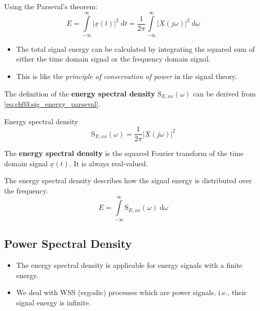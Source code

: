 \begin{refsection}
Using the Parseval's theorem:
\begin{equation}
	E = \int\limits_{-\infty}^{\infty} \left|\underline{x}(t)\right|^2 \; \mathrm{d} t = \frac{1}{2 \pi} \int\limits_{-\infty}^{\infty} \left|\underline{X}\left(j \omega\right)\right|^2 \; \mathrm{d} \omega
	\label{eq:ch03:sig_energy_parseval}
\end{equation}

\begin{itemize}
	\item The total signal energy can be calculated by integrating the squared sum of either the time domain signal or the frequency domain signal.
	\item This is like the \emph{principle of conservation of power} in the signal theory.
\end{itemize}

The definition of the \textbf{energy spectral density} $\mathrm{S}_{E,xx}(\omega)$ can be derived from \eqref{eq:ch03:sig_energy_parseval}.

\begin{definition}{Energy spectral density}
	\begin{equation}
		\mathrm{S}_{E,xx}(\omega) = \frac{1}{2 \pi} \left|\underline{X}\left(j \omega\right)\right|^2
	\end{equation}%
	
	The  \textbf{energy spectral density} is the squared Fourier transform of the time domain signal $\underline{x}(t)$. It is always real-valued.
\end{definition}

The energy spectral density describes how the signal energy is distributed over the frequency.
\begin{equation}
	E = \int\limits_{-\infty}^{\infty} \mathrm{S}_{E,xx}(\omega) \; \mathrm{d} \omega
\end{equation}

\subsection{Power Spectral Density}

\begin{itemize}
	\item The energy spectral density is applicable for energy signals with a finite energy.
	\item We deal with \ac{WSS} (ergodic) processes which are power signals, i.e., their signal energy is infinite.
\end{itemize}


\end{refsection}
